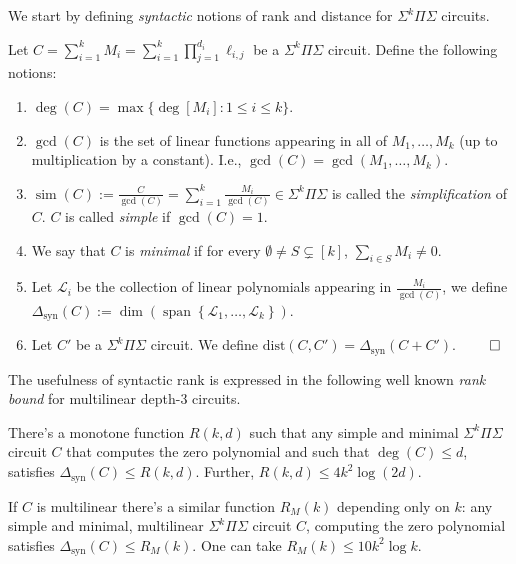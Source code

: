 \documentclass[12pt]{article}
\renewcommand{\set}[1]{\left\{ #1 \right\}}
\newcommand{\SumProdSumk}{\Sigma^k \Pi \Sigma}
\newcommand{\Sps}[1]{\Sigma^{#1} \Pi\Sigma}
\newcommand{\ranksyn}{\Delta_{\text{syn}}}
\newcommand{\dist}{\text{dist}}
\DeclareMathOperator{\Span}{\text{span}}
\DeclareMathOperator{\simp}{\text{sim}}
\newcommand{\eqdef}{:=}
\begin{document}
	We start by defining \emph{syntactic} notions of rank and distance for $\Sps{k}$ circuits.
	
	\begin{definition}
		\label{def:syn-rank-dist}
		Let $C = \sum_{i= 1}^k M_i = \sum_{i=1}^{k}\prod_{j=1}^{d_i}\ell_{i,j}$ be a $\Sps{k}$ circuit. Define the following notions:
		\begin{enumerate}
			\item $\deg(C) = \max \{ \deg [M_i] : 1 \le i \le k \}$.
			\item $\gcd(C)$ is the set of linear functions appearing in all of $M_1, \ldots, M_k$ (up to multiplication by a constant). I.e., $\gcd(C)=\gcd(M_1,\ldots,M_k)$.
			\item $\simp(C) \eqdef \frac{C}{\gcd(C)} = \sum_{i=1}^k \frac{M_i}{\gcd(C)}\in \Sps{k}$ is called the \emph{simplification} of $C$. $C$ is called \emph{simple} if $\gcd(C)=1$.
			\item We say that $C$ is \emph{minimal} if for every $\emptyset\neq S \subsetneq [k]$, $\sum_{i\in S}M_i\neq 0$.
			\item Let $\mathcal{L}_i$ be the collection of linear polynomials appearing in $\frac{M_i}{\gcd(C)}$, we define $\ranksyn(C) \eqdef \dim(\Span\set{\mathcal{L}_1,\ldots,\mathcal{L}_k})$. 
			\item Let $C'$ be a $\SumProdSumk$ circuit.  We define $\dist(C,C') = \ranksyn(C + C')$. $\hfill \qedhere$
		\end{enumerate}
	\end{definition}
	
	The usefulness of syntactic rank is expressed in the following well known \emph{rank bound} for multilinear depth-$3$ circuits.
	
	\begin{theorem}
		\label{thm:rank bound ml}
		There's a monotone function $R(k,d)$ such that 
		any simple and minimal $\Sps{k}$ circuit $C$ that computes the zero polynomial and such that $\deg(C)\leq d$,  satisfies $\ranksyn(C) \le R(k,d)$. Further, $R(k,d) \le  4k^2 \log (2d)$.
		
		If $C$ is multilinear there's a similar function $R_M(k)$ depending only on $k$: any simple and minimal, multilinear $\Sps{k}$ circuit $C$, computing the zero polynomial satisfies $\ranksyn(C) \leq R_M(k)$. One can take $R_M(k) \le 10 k^2 \log k$.
	\end{theorem}
	
	
\end{document}
